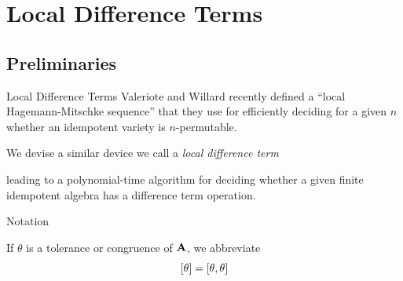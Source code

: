 \documentclass[notes=hide,12pt,xcolor=dvipsnames%
   ]{beamer}
\renewcommand{\cite}[1]{\relax}
\renewcommand{\defn}[1]{\alert{#1}}
\theoremstyle{definition}
\begin{document}
\section{Local Difference Terms}

\subsection{Preliminaries}

\begin{frame}[label=local-diff-term-defs,shrink=5]{Local Difference Terms}
Valeriote and Willard recently defined %
a ``local Hagemann-Mitschke sequence'' that they use for
efficiently deciding for a given $n$ whether an idempotent
variety is $n$-permutable. 

  \bigskip

  We devise a similar device we call a \emph{\alert{local difference term}}

  leading to a polynomial-time
  algorithm for deciding whether a given finite idempotent algebra
  has a difference term operation.

\end{frame}

\begin{frame}[label=local-diff-term-defs,shrink]{Notation}

  If $\theta$ is a tolerance or congruence of $\mathbf{A}$, we abbreviate
  {\Large  \[
  [\theta]= [\theta, \theta]
  \]}
\vfill
\end{frame}
\end{document}
